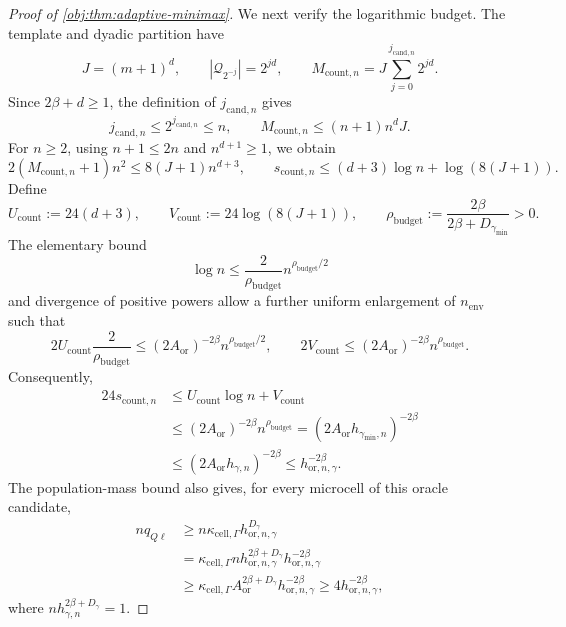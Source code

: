 \documentclass[11pt]{article}
\begin{document}
\begin{proof}[Proof of \cref{obj:thm:adaptive-minimax}]
We next verify the logarithmic budget. The template and dyadic partition have
\[
J=(m+1)^d,
\qquad
|\mathcal Q_{2^{-j}}|=2^{jd},
\qquad
M_{\mathrm{count},n}
=J\sum_{j=0}^{j_{\mathrm{cand},n}}2^{jd}.
\]
Since \(2\beta+d\ge1\), the definition of \(j_{\mathrm{cand},n}\) gives
\[
j_{\mathrm{cand},n}\le2^{j_{\mathrm{cand},n}}\le n,
\qquad
M_{\mathrm{count},n}\le(n+1)n^dJ.
\]
For \(n\ge2\), using \(n+1\le2n\) and \(n^{d+1}\ge1\), we obtain
\[
2(M_{\mathrm{count},n}+1)n^2
\le8(J+1)n^{d+3},
\qquad
s_{\mathrm{count},n}
\le(d+3)\log n+\log(8(J+1)).
\]
Define
\[
U_{\mathrm{count}}:=24(d+3),
\qquad
V_{\mathrm{count}}:=24\log(8(J+1)),
\qquad
\rho_{\mathrm{budget}}
:=\frac{2\beta}{2\beta+D_{\gamma_{\min}}}>0.
\]
The elementary bound
\[
\log n\le\frac2{\rho_{\mathrm{budget}}}
 n^{\rho_{\mathrm{budget}}/2}
\]
and divergence of positive powers allow a further uniform enlargement of \(n_{\mathrm{env}}\) such that
\[
2U_{\mathrm{count}}\frac2{\rho_{\mathrm{budget}}}
\le(2A_{\mathrm{or}})^{-2\beta}
 n^{\rho_{\mathrm{budget}}/2},
\qquad
2V_{\mathrm{count}}
\le(2A_{\mathrm{or}})^{-2\beta}n^{\rho_{\mathrm{budget}}}.
\]
Consequently,
\[
\begin{aligned}
24s_{\mathrm{count},n}
&\le U_{\mathrm{count}}\log n+V_{\mathrm{count}}\\
&\le(2A_{\mathrm{or}})^{-2\beta}n^{\rho_{\mathrm{budget}}}
=(2A_{\mathrm{or}}h_{\gamma_{\min},n})^{-2\beta}\\
&\le(2A_{\mathrm{or}}h_{\gamma,n})^{-2\beta}
\le h_{\mathrm{or},n,\gamma}^{-2\beta}.
\end{aligned}
\]
The population-mass bound also gives, for every microcell of this oracle candidate,
\[
\begin{aligned}
nq_{Q\ell}
&\ge n\kappa_{\mathrm{cell},\Gamma}
 h_{\mathrm{or},n,\gamma}^{D_\gamma}\\
&=\kappa_{\mathrm{cell},\Gamma}
 n h_{\mathrm{or},n,\gamma}^{2\beta+D_\gamma}
 h_{\mathrm{or},n,\gamma}^{-2\beta}\\
&\ge\kappa_{\mathrm{cell},\Gamma}
 A_{\mathrm{or}}^{2\beta+D_\gamma}
 h_{\mathrm{or},n,\gamma}^{-2\beta}
\ge4h_{\mathrm{or},n,\gamma}^{-2\beta},
\end{aligned}
\]
where \(nh_{\gamma,n}^{2\beta+D_\gamma}=1\).


\end{proof}
\end{document}
